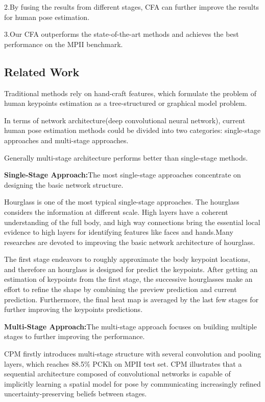 \documentclass[11pt]{article}
\begin{document}
2.By fusing the results from different stages, CFA can further improve the results for human pose 
estimation.

3.Our CFA outperforms the state-of-the-art methods and achieves the best performance on the MPII 
benchmark.

\subsection{Related Work}
Traditional methods rely on hand-craft features, which formulate the problem of human keypoints estimation as a tree-structured or graphical model problem.

In terms of network architecture(deep convolutional neural network), current human pose estimation methods could be divided into two categories: single-stage approaches and multi-stage approaches.

Generally multi-stage architecture performs better than single-stage methods.

\textbf{Single-Stage Approach:}The most single-stage approaches concentrate on designing the basic network structure.

Hourglass is one of the most typical single-stage approaches. The hourglass considers the information at different scale. High layers have a coherent understanding of the full body, and high way connections bring the essential local evidence to high layers for identifying features like faces and hands.Many researches are devoted to improving the basic network architecture of hourglass.

The first stage endeavors to roughly approximate the body keypoint locations, and therefore an
hourglass is designed for predict the keypoints. After getting an estimation of keypoints from the first stage, the successive hourglasses make an effort to refine the shape by combining the preview prediction and current prediction. Furthermore, the final heat map is averaged by the last few stages for further improving the keypoints predictions.

\textbf{Multi-Stage Approach:}The multi-stage approach focuses on building multiple stages to further
improving the performance.

CPM firstly introduces multi-stage structure with several convolution and pooling layers, which reaches 88.5\% PCKh on MPII test set. CPM illustrates that a sequential architecture composed of convolutional networks is capable of implicitly learning a spatial model for pose by communicating increasingly refined uncertainty-preserving beliefs between stages.
\end{document}
